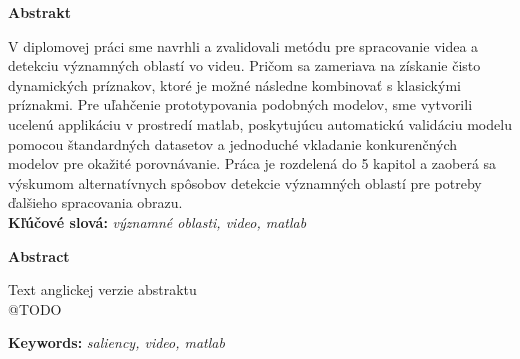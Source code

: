 {\noindent\large\bf Abstrakt}

\vspace{1.8cm}
V diplomovej práci sme navrhli a zvalidovali metódu pre spracovanie videa a detekciu významných oblastí vo videu.
Pričom sa zameriava na získanie čisto dynamických príznakov, ktoré je možné následne kombinovať s klasickými príznakmi.
Pre uľahčenie prototypovania podobných modelov, sme vytvorili ucelenú applikáciu v prostredí matlab, poskytujúcu automatickú validáciu modelu pomocou štandardných datasetov a jednoduché vkladanie konkurenčných modelov pre okažité porovnávanie. Práca je rozdelená do 5 kapitol a zaoberá sa výskumom alternatívnych spôsobov detekcie významných oblastí pre potreby ďalšieho spracovania obrazu.
\\

{\parindent0pt \textbf{Kľúčové slová:} \emph{významné oblasti, video, matlab}}

\newpage
 {\noindent\large\bf Abstract}
  \vspace{1.8cm}


Text anglickej verzie abstraktu
\\
@TODO

{\parindent0pt \textbf{Keywords:} \emph{saliency, video, matlab}}


\newpage	
